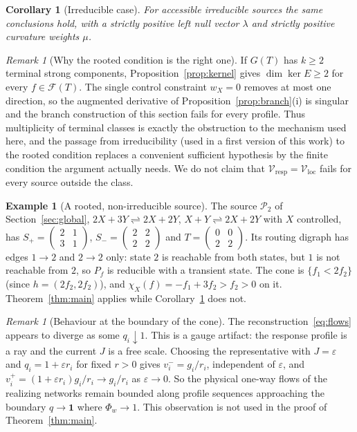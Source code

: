 \documentclass[11pt,reqno]{amsart}
\theoremstyle{plain}
\newtheorem{corollary}[theorem]{Corollary}
\theoremstyle{definition}
\newtheorem{example}[theorem]{Example}
\theoremstyle{remark}
\newtheorem{remark}[theorem]{Remark}
\numberwithin{equation}{section}
\newcommand{\one}{\mathbf{1}}
\newcommand{\Ker}{\operatorname{ker}}
\newcommand{\Sp}{S_{+}}
\newcommand{\Sm}{S_{-}}
\newcommand{\cone}{\mathcal{F}}
\newcommand{\Vresp}{\mathcal{V}_{\mathrm{resp}}}
\newcommand{\Vloc}{\mathcal{V}_{\mathrm{loc}}}
\begin{document}
\begin{corollary}[Irreducible case]\label{cor:irreducible}
For accessible irreducible sources the same conclusions hold, with a strictly positive left null vector $\lambda$ and strictly positive curvature weights $\mu$.
\end{corollary}

\begin{remark}[Why the rooted condition is the right one]\label{rem:sharp}
If $G(T)$ has $k\ge2$ terminal strong components, Proposition~\ref{prop:kernel} gives $\dim\Ker E\ge2$ for every $f\in\cone(T)$.  The single control constraint $w_X=0$ removes at most one direction, so the augmented derivative of Proposition~\ref{prop:branch}(i) is singular and the branch construction of this section fails for every profile.  Thus multiplicity of terminal classes is exactly the obstruction to the mechanism used here, and the passage from irreducibility (used in a first version of this work) to the rooted condition replaces a convenient sufficient hypothesis by the finite condition the argument actually needs.  We do not claim that $\Vresp=\Vloc$ fails for every source outside the class.
\end{remark}

\begin{example}[A rooted, non-irreducible source]\label{ex:rooted}
The source $\mathcal P_2$ of Section~\ref{sec:global}, $2X+3Y\rightleftharpoons2X+2Y$, $X+Y\rightleftharpoons2X+2Y$ with $X$ controlled, has $\Sp=\begin{pmatrix}2&1\\3&1\end{pmatrix}$, $\Sm=\begin{pmatrix}2&2\\2&2\end{pmatrix}$ and $T=\begin{pmatrix}0&0\\2&2\end{pmatrix}$.  Its routing digraph has edges $1\to2$ and $2\to2$ only: state $2$ is reachable from both states, but $1$ is not reachable from $2$, so $P_f$ is reducible with a transient state.  The cone is $\{f_1<2f_2\}$ (since $h=(2f_2,2f_2)$), and $\chi_X(f)=-f_1+3f_2>f_2>0$ on it.  Theorem~\ref{thm:main} applies while Corollary~\ref{cor:irreducible} does not.
\end{example}

\begin{remark}[Behaviour at the boundary of the cone]\label{rem:gauge}
The reconstruction~\eqref{eq:flows} appears to diverge as some $q_i\downarrow1$.  This is a gauge artifact: the response profile is a ray and the current $J$ is a free scale.  Choosing the representative with $J=\varepsilon$ and $q_i=1+\varepsilon r_i$ for fixed $r>0$ gives $v^-_i=g_i/r_i$, independent of $\varepsilon$, and $v^+_i=(1+\varepsilon r_i)g_i/r_i\to g_i/r_i$ as $\varepsilon\to0$.  So the physical one-way flows of the realizing networks remain bounded along profile sequences approaching the boundary $q\to\one$ where $\Phi_w\to1$.  This observation is not used in the proof of Theorem~\ref{thm:main}.
\end{remark}
\end{document}
